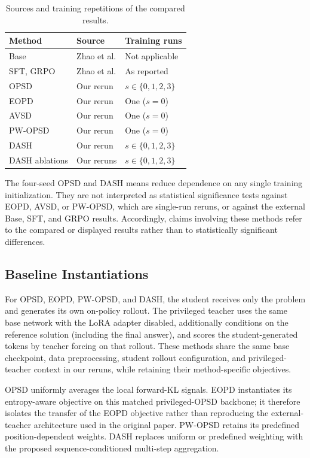 \documentclass[letterpaper]{article} %
\begin{document}
\begin{table}[!htbp]
\centering
\scriptsize
\setlength{\tabcolsep}{3.5pt}
\begin{tabular}{@{}lll@{}}
\toprule
\textbf{Method} & \textbf{Source} & \textbf{Training runs} \\
\midrule
Base & Zhao et al. & Not applicable \\
SFT, GRPO & Zhao et al. & As reported \\
OPSD & Our rerun & $s\in\{0,1,2,3\}$ \\
EOPD & Our rerun & One ($s=0$) \\
AVSD & Our rerun & One ($s=0$) \\
PW-OPSD & Our rerun & One ($s=0$) \\
DASH & Our rerun & $s\in\{0,1,2,3\}$ \\
DASH ablations & Our reruns & $s\in\{0,1,2,3\}$ \\
\bottomrule
\end{tabular}
\caption{Sources and training repetitions of the compared results.}
\label{tab:supp_result_provenance}
\end{table}

The four-seed OPSD and DASH means reduce dependence on any single
training initialization. They are not interpreted as statistical significance
tests against EOPD, AVSD, or PW-OPSD, which are single-run reruns, or
against the external Base, SFT, and GRPO results. Accordingly, claims
involving these methods refer to the compared or displayed results
rather than to statistically significant differences.

\subsection{Baseline Instantiations}
\label{sec:supp_baseline_instantiations}

For OPSD, EOPD, PW-OPSD, and DASH, the student receives only the
problem and generates its own on-policy rollout. The privileged teacher
uses the same base network with the LoRA adapter disabled, additionally
conditions on the reference solution (including the final answer), and
scores the student-generated tokens by teacher forcing on that rollout.
These methods share the same base checkpoint, data preprocessing,
student rollout configuration, and privileged-teacher context in our
reruns, while retaining their method-specific objectives.

OPSD uniformly averages the local forward-KL signals. EOPD instantiates
its entropy-aware objective on this matched privileged-OPSD backbone;
it therefore isolates the transfer of the EOPD objective rather than
reproducing the external-teacher architecture used in the original
paper. PW-OPSD retains its predefined position-dependent weights.
DASH replaces uniform or predefined weighting with the proposed
sequence-conditioned multi-step aggregation.
\end{document}
